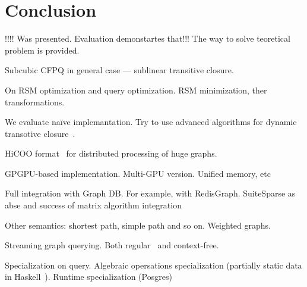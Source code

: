 \section{Conclusion}

!!!! Was presented.
Evaluation demonstartes that!!!
The way to solve teoretical problem is provided.

Subcubic CFPQ in general case --- sublinear transitive closure.

On RSM optimization and query optimization. RSM minimization, ther transformations.

We evaluate na{\"i}ve implemantation. Try to use advanced algorithms for dynamic transotive closure~\cite{cs6345}.

HiCOO format~\cite{!!!} for distributed processing of huge graphs.

GPGPU-based implementation. Multi-GPU version. Unified memory, etc~\cite{!!!}

Full integration with Graph DB.
For example, with RedisGraph.
SuiteSparse as abse and success of matrix algorithm integration~\cite{!!!}

Other semantics: shortest path, simple path and so on. 
Weighted graphs.

Streaming graph querying.
Both regular~\cite{Pacaci2020RegularPQ} and context-free.

Specialization on query.
Algebraic opersations specialization (partially static data in Haskell~\cite{!!!}).
Runtime specialization (Posgres)~\cite{!!!}
